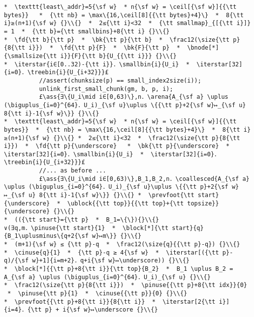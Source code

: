 \documentclass[10pt,twoside]{report}
\makeatletter
\newcommand{\ml}[2][t]{\mbox{\mdseries\begin{tabular}[#1]{@{}L@{}}#2\end{tabular}}}
\newcommand{\ass}[1]{\ensuremath{{\color{blue}\left\{\ml[c]{#1}\right\}}}}
\renewcommand{\ceil}[2][]{\left\lceil{#2}\right\rceil_{#1}}
\newcommand{\iterstar}[2][]{\text{\LARGE $*$}^{#1}_{#2}}
\makeatother
\begin{document}
\begin{lstlisting}
*  \texttt{least\_addr}=5{\sf w}  * n{\sf w} = \ceil[{\sf w}]{{\tt bytes}}   *  {\tt nb} = \max\{16,\ceil[8]{{\tt bytes}+4}\}  *  8{\tt i}≥(n+1){\sf w} {}\\{}  *  2≤{\tt i}<32  *  {\tt smallmap}_{[{\tt i}]} = 1  *  {\tt b}={\tt smallbins}+8{\tt i} {}\\{}
*  \fd{\tt b}{\tt p}  *  \bk{\tt p}{\tt b}  *  \frac12(\size{\tt p}{8{\tt i}})  *  \fd{\tt p}{F}  *  \bk{F}{\tt p}  *  \bnode[*]{\smallsize{\tt i}}{F}{\tt b}{U_{{\tt i}}} {}\\{}
*  \iterstar{i∈[0..32)-{\tt i}}．\smallbin{i}{U_i}  *  \iterstar[32]{i=0}．\treebin{i}{U_{i+32}}}£ 
          //assert(chunksize(p) == small_index2size(i));
          unlink_first_small_chunk(gm, b, p, i);
          £\ass{∃\{U_i\mid i∈[0,63)\},n．\arena{A_{\sf a} \uplus (\biguplus_{i=0}^{64}．U_i)_{\sf u}\uplus \{{\tt p}+2{\sf w}↦_{\sf u} 8{\tt i}-1{\sf w}\}} {}\\{}
*  \texttt{least\_addr}=5{\sf w}  * n{\sf w} = \ceil[{\sf w}]{{\tt bytes}}  *  {\tt nb} = \max\{16,\ceil[8]{{\tt bytes}+4}\}  *  8{\tt i}≥(n+1){\sf w} {}\\{} *  2≤{\tt i}<32  *  \frac12(\size{\tt p}{8{\tt i}})  *  \fd{\tt p}{\underscore}   *  \bk{\tt p}{\underscore}  *  \iterstar[32]{i=0}．\smallbin{i}{U_i}  *  \iterstar[32]{i=0}．\treebin{i}{U_{i+32}}}£
          //... as before ...
          £\ass{∃\{U_i\mid i∈[0,63)\},B_1,B_2,n．\coallesced{A_{\sf a} \uplus (\biguplus_{i=0}^{64}．U_i)_{\sf u}\uplus \{{\tt p}+2{\sf w}↦_{\sf u} 8{\tt i}-1{\sf w}\}} {}\\{} *  \prevfoot{\tt start}{\underscore}  *  \ublock{{\tt top}}{{\tt top}+{\tt topsize}}{\underscore} {}\\{}
*  (({\tt start}={\tt p}  *  B_1=\{\}){}\\{}
∨(∃q,m．\pinuse{\tt start}{1}  *  \block[*]{\tt start}{q}{B_1\uplusminus\{q+2{\sf w}↦m\}} {}\\{}
*  (m+1){\sf w} ≤ {\tt p}-q  *  \frac12(\size{q}{{\tt p}-q}) {}\\{}
*  \cinuse{q}{1}  *  {\tt p}-q ≥ 4{\sf w}  *  \iterstar[({\tt p}-q)/{\sf w}+1]{i=m+2}．q+i{\sf w}↦\underscore)) {}\\{}
*  \block[*]{{\tt p}+8{\tt i}}{\tt top}{B_2}  *  B_1 \uplus B_2 = A_{\sf a} \uplus (\biguplus_{i=0}^{64}．U_i)_{\sf u} {}\\{}
*  \frac12(\size{\tt p}{8{\tt i}})  *  \pinuse{{\tt p}+8{\tt idx}}{0}  *  \pinuse{\tt p}{1}  *  \cinuse{{\tt p}}{0} {}\\{}
*  \prevfoot{{\tt p}+8{\tt i}}{8{\tt i}}  *  \iterstar[2{\tt i}]{i=4}．{\tt p} + i{\sf w}↦\underscore {}\\{}

\end{lstlisting}
\end{document}
